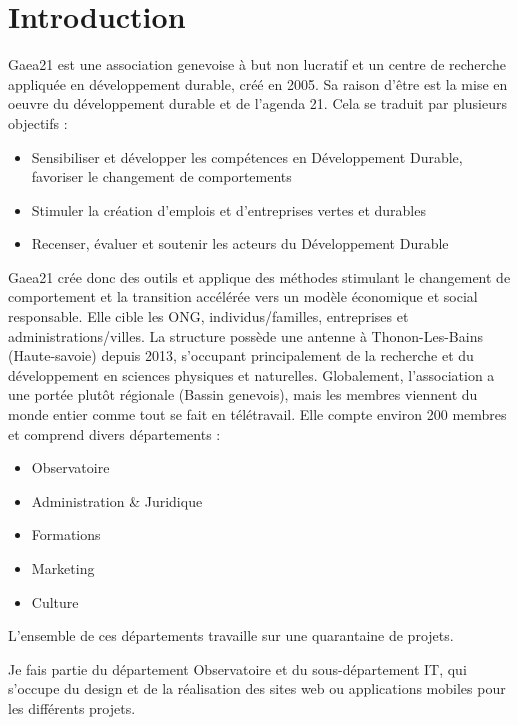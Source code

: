 \section*{Introduction} 
{}
\thispagestyle{noTitledHeader}


Gaea21 est une association genevoise à but non lucratif et un centre de recherche appliquée en développement durable, créé en 2005.
Sa raison d'être est la mise en oeuvre du développement durable et de l'agenda 21. Cela se traduit par plusieurs objectifs :
\begin{itemize}
    \item Sensibiliser et développer les compétences en Développement Durable, favoriser le changement
    de comportements 
    \item Stimuler la création d’emplois et d’entreprises vertes et durables
    \item Recenser, évaluer et soutenir les acteurs du Développement Durable
\end{itemize}

\bigbreak
Gaea21 crée donc des outils et applique des méthodes stimulant le changement de comportement et la transition
accélérée vers un modèle économique et social responsable.
Elle cible les ONG, individus/familles, entreprises et administrations/villes.
\bigbreak
La structure possède une antenne à Thonon-Les-Bains (Haute-savoie) depuis 2013, s'occupant principalement de la recherche et du développement en sciences physiques et naturelles.
Globalement, l'association a une portée plutôt régionale (Bassin genevois), mais les membres viennent du monde entier comme tout se fait en télétravail.
\bigbreak
Elle compte environ 200 membres et comprend divers départements :
\begin{itemize}
    \item Observatoire
    \item Administration \& Juridique 
    \item Formations
    \item Marketing
    \item Culture
\end{itemize} 

L'ensemble de ces départements travaille sur une quarantaine de projets.

Je fais partie du département Observatoire et du sous-département IT, qui s'occupe 
du design et de la réalisation des sites web ou applications mobiles pour les différents projets.



